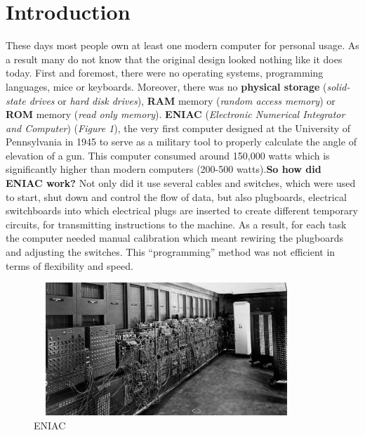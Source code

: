 \documentclass[12pt]{article}
\begin{document}
\section{Introduction}
These days most people own at least one modern computer for personal usage. As a result many do not know that the original design looked nothing like it does today.\newline\newline
First and foremost, there were no operating systems, programming languages, mice or keyboards. Moreover, there was no \textbf{physical storage} (\textit{solid-state drives} or \textit{hard disk drives}),
\textbf{RAM} memory (\textit{random access memory}) or \textbf{ROM} memory (\textit{read only memory}). \textbf{ENIAC} (\textit{Electronic Numerical Integrator and Computer}) (\textit{Figure 1}),
the very first computer designed at the University of Pennsylvania in 1945 to serve as a military tool to properly calculate the angle of elevation of a gun. This computer consumed around 150,000 watts
which is significantly higher than modern computers (200-500 watts).\newline\newline \textbf{So how did ENIAC work?}\newline\newline
Not only did it use several cables and switches, which were used to start, shut down and control the flow of data, but also plugboards, electrical switchboards into which electrical plugs are inserted to
create different temporary circuits, for transmitting instructions to the machine. As a result, for each task the computer needed manual calibration which meant rewiring the plugboards and adjusting the switches.
This “programming” method was not efficient in terms of flexibility and speed.

\begin{figure}[H]
    \centering
    \includegraphics[width=10cm, height=5cm]{images/ENIAC.png}
    \caption{ENIAC}
\end{figure}
\end{document}
